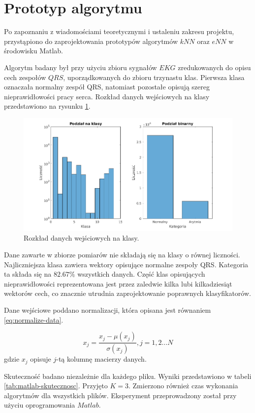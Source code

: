 \section{Prototyp algorytmu}
\label{chap:prototype}
Po zapoznaniu z wiadomościami teoretycznymi i ustaleniu zakresu projektu, przystąpiono do zaprojektowania prototypów algorytmów $kNN$ oraz $eNN$ w środowisku Matlab.

Algorytm badany był przy użyciu zbioru sygnałów $EKG$ zredukowanych do opisu cech zespołów $QRS$, uporządkowanych do zbioru trzynastu klas. Pierwsza klasa oznaczała normalny zespół QRS, natomiast pozostałe opisują szereg nieprawidłowości pracy serca.
Rozkład danych wejściowych na klasy przedstawiono na rysunku \ref{fig:klasy-danych}.

\begin{figure}[H]
	\centering
	\includegraphics[width=18cm]{img/licznosc_klas}
	\caption{Rozkład danych wejściowych na klasy.}
	\label{fig:klasy-danych}
\end{figure}
Dane zawarte w zbiorze pomiarów nie składają się na klasy o równej liczności. Najliczniejsza klasa zawiera wektory opisujące normalne zespoły QRS. Kategoria ta składa się na $82.67\%$ wszystkich danych. Część klas opisujących nieprawidłowości reprezentowana jest przez zaledwie kilka lubi kilkadziesiąt wektorów cech, co znacznie utrudnia zaprojektowanie poprawnych klasyfikatorów.

Dane wejściowe poddano normalizacji, która opisana jest równaniem \ref{eq:normalize-data}.

\begin{equation}
\label{eq:normalize-data}
x_j = \frac{x_j - \mu(x_j)}{\sigma(x_j)}, j=1,2...N
\end{equation}
gdzie $x_j$ opisuje $j$-tą kolumnę macierzy danych.

Skuteczność badano niezależnie dla każdego pliku. Wyniki przedstawiono w tabeli \ref{tab:matlab-skutecznosc}. Przyjęto $K=3$. Zmierzono również czas wykonania algorytmów dla wszystkich plików. Eksperyment przeprowadzony został przy użyciu oprogramowania $Matlab$.

